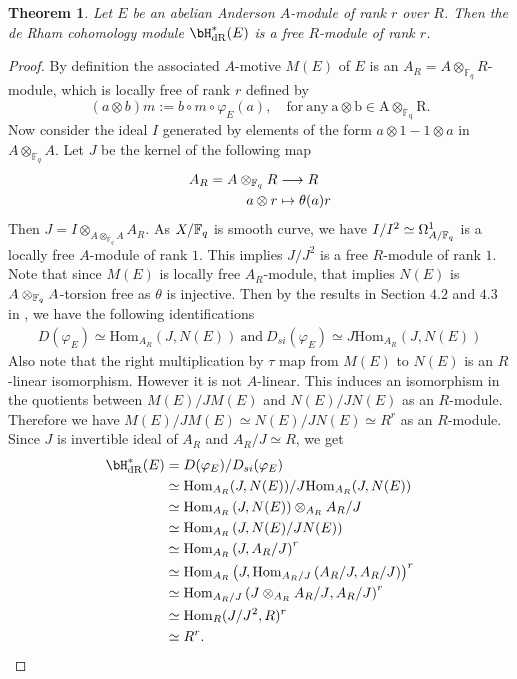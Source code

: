 \documentclass{amsart}
\newtheorem {theorem} {\bf{Theorem}}[section]
\numberwithin {equation}{section}
\newcommand{\Hom}{\mathrm{Hom}}
\begin{document}
\begin{theorem}\label{rank_deRham} 
Let $E$ be an abelian Anderson $A$-module of rank $r$ over $R$. Then the de Rham cohomology module $\bH^{*}_{\mathrm{dR}}({E})$ is a free $R$-module of rank $r$. 

\end{theorem}
\begin{proof}
By definition the associated $A$-motive $M(E)$ of $E$ is an $A_{R}=A\otimes_{\mathbb{F}_{q}} R$-module, which is locally free of rank $r$ defined by
$$(a\otimes b)m:=b\circ m\circ \varphi_{E}(a),\quad \mathrm{for \ any \ a\otimes b \in A\otimes_{\mathbb{F}_{q}}R}.$$ 
Now consider the ideal $I$ generated by elements of the form $a\otimes 1-1\otimes a$ in $A\otimes_{\mathbb{F}_{q}} A$. Let $J$ be the kernel of the following map \begin{align*}
A_{R}=A\otimes_{\mathbb{F}_{q}} R&\longrightarrow R\\
a\otimes r &\mapsto \theta(a)r
\end{align*}
Then $J=I\otimes_{A\otimes_{\mathbb{F}_{q}} A} A_{R}$. As $X/\mathbb{F}_{q}$ is smooth curve, we have $I/I^{2}\simeq \Omega^{1}_{A/\mathbb{F}_{q}}$ is a locally free $A$-module of rank $1$. This implies $J/J^{2}$ is a free $R$-module of rank $1$. 
Note that since $M(E)$ is locally free $A_{R}$-module, that implies $N(E)$ is $A\otimes_{\mathbb{F}_{q}} A$-torsion free as $\theta$ is injective. 
Then by the results in Section $4.2$ and $4.3$ in \cite{Gekeler_b}, we have the following identifications
\begin{align*}
D(\varphi_{E})\simeq\Hom_{A_{R}}(J, N(E)) ~\mathrm{and} ~D_{si}(\varphi_{E})\simeq J\Hom_{A_{R}}(J, N(E))
\end{align*}
Also note that the right multiplication by $\tau$ map from $M(E)$ to $N(E)$ is an $R$-linear isomorphism. However it is not $A$-linear. This induces an isomorphism in the quotients between $M(E)/JM(E)$ and $N(E)/JN(E)$ as an $R$-module. Therefore we have $M(E)/JM(E)\simeq N(E)/JN(E)\simeq R^{r}$ as an $R$-module. Since $J$ is invertible ideal of $A_{R}$ and $A_{R}/J\simeq R$, we get
\begin{align*}
\bH^{*}_{\mathrm{dR}}({E})&=D(\varphi_{E})/D_{si}(\varphi_{E})\\
& \simeq \Hom_{A_{R}}(J, N(E))/J\Hom_{A_{R}}(J, N(E))\\
&\simeq \Hom_{A_{R}}\left(J, N(E)\right)\otimes _{A_{R}} A_{R}/J\\
&\simeq \Hom_{A_{R}}\left(J, N(E)/JN(E)\right)\\
&\simeq \Hom_{A_{R}}\left(J, A_{R}/J\right)^{r}\\
&\simeq \Hom_{A_{R}}\left(J,\Hom_{A_{R}/J}\left(A_{R}/J,A_{R}/J\right)\right)^{r}\\
&\simeq \Hom_{A_{R}/J}\left(J\otimes_{A_{R}}{A_{R}/J}, A_{R}/J\right)^{r}\\
&\simeq \Hom_{R}(J/J^{2}, R)^{r}\\
&\simeq R^{r}.
\end{align*}
\end{proof}
\end{document}
